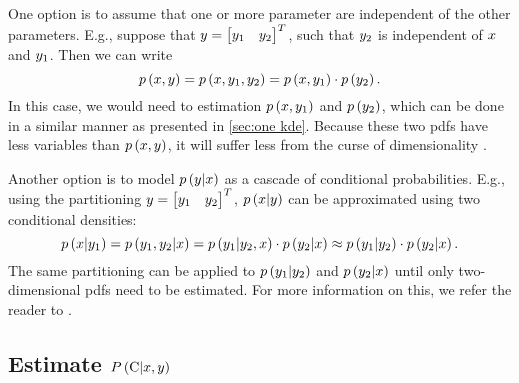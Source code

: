 One option is to assume that one or more parameter are independent of the other parameters. 
E.g., suppose that $y=\begin{bmatrix}y_1 & y_2\end{bmatrix}^T$, such that $y_2$ is independent of $x$ and $y_1$.
Then we can write
\begin{equation}
	p\left( x, y \right)
	= p\left( x, y_1, y_2 \right)
	= p\left( x, y_1 \right) \cdot p\left( y_2 \right).
\end{equation}
In this case, we would need to estimation $p\left( x, y_1 \right)$ and $p\left( y_2 \right)$, which can be done in a similar manner as presented in \cref{sec:one kde}.
Because these two \acp{pdf} have less variables than $p\left( x, y \right)$, it will suffer less from the curse of dimensionality \cite{scott2015multivariate}.

Another option is to model $p\left(  y | x  \right)$ as a cascade of conditional probabilities. E.g., using the partitioning $y=\begin{bmatrix}y_1 & y_2\end{bmatrix}^T$, $p\left(  x | y  \right)$ can be approximated using two conditional densities:
\begin{equation}
	p\left(  x | y_1  \right)
	= p\left(  y_1, y_2 | x  \right)
	= p\left(  y_1 | y_2, x  \right) \cdot p\left(  y_2 | x  \right)
	\approx p\left(  y_1 | y_2  \right) \cdot p\left(  y_2 | x  \right).
\end{equation}
The same partitioning can be applied to $p\left(  y_1 | y_2  \right)$ and $p\left(  y_2 | x  \right)$ until only two-dimensional \acp{pdf} need to be estimated.
For more information on this, we refer the reader to \autocite{aas2009paircopula, nagler2016evading}.



\subsection{Estimate $P\left(  \mathrm{C} | x, y  \right)$}
\label{sec:estimate collision}

